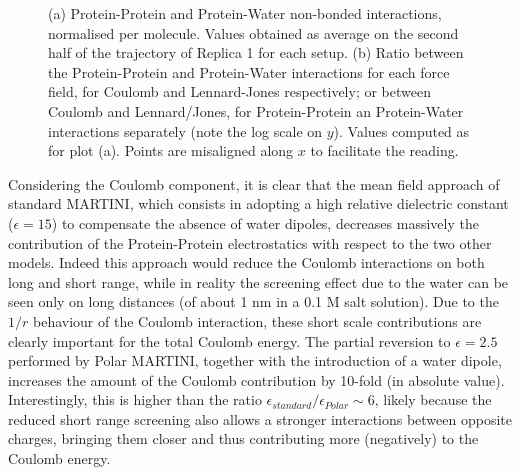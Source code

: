 \begin{figure}[p!]
\centering
{} 
\caption[Non-bonded protein energy contribution to capsule structures]{(a) Protein-Protein and Protein-Water non-bonded interactions, normalised per molecule. Values obtained as average on the second half of the trajectory of Replica 1 for each setup. (b) Ratio between the Protein-Protein and Protein-Water interactions for each force field, for Coulomb and Lennard-Jones respectively; or between Coulomb and Lennard/Jones, for Protein-Protein an Protein-Water interactions separately (note the log scale on $y$). Values computed as for plot (a). Points are misaligned along $x$ to facilitate the reading.}
\label{fig:eng_cg}
\end{figure}

Considering the Coulomb component, it is clear that the mean field approach of standard MARTINI, which consists in adopting a high relative dielectric constant ($\epsilon = 15$) to compensate the absence of water dipoles, decreases massively the contribution of the Protein-Protein electrostatics with respect to the two other models.
%
Indeed this approach would reduce the Coulomb interactions on both long and short range, while in reality the screening effect due to the water can be seen only on long distances (of about 1 nm in a 0.1 M salt solution). Due to the $1/r$ behaviour of the Coulomb interaction, these short scale contributions are clearly important for the total Coulomb energy.
%
The partial reversion to $\epsilon = 2.5$ performed by Polar MARTINI, together with the introduction of a water dipole, increases the amount of the Coulomb contribution by 10-fold (in absolute value).
%
Interestingly, this is higher than the ratio $\epsilon_{standard}/\epsilon_{Polar} \sim 6$, likely because the reduced short range screening also allows a stronger interactions between opposite charges, bringing them closer and thus contributing more (negatively) to the Coulomb energy.

